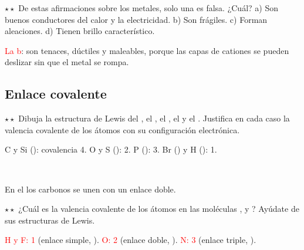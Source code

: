 \begin{exercise}
    \(\star\star\) De estas afirmaciones sobre los metales, solo una es falsa. ¿Cuál? a) Son buenos conductores del calor y la
    electricidad. b) Son frágiles. c) Forman aleaciones. d) Tienen brillo característico.
    \begin{solu}
        \textcolor{red}{La b}: son tenaces, dúctiles y maleables, porque las capas de cationes se pueden deslizar sin que el metal
        se rompa.
    \end{solu}
\end{exercise}

\subsection{Enlace covalente}

\begin{exercise}
    \(\star\star\) Dibuja la estructura de Lewis del , el , el , el  y el .
    Justifica en cada caso la valencia covalente de los átomos con su configuración electrónica.
    \begin{solu}
        C y Si (): covalencia 4. O y S (): 2. P (): 3. Br
        () y H (): 1.
        \begin{center}
            \textcolor{red}{} \quad
            \textcolor{red}{} \quad
            \textcolor{red}{} \\[6pt]
            \textcolor{red}{} \quad
            \textcolor{red}{}
        \end{center}
        En el  los carbonos se unen con un enlace doble.
    \end{solu}
\end{exercise}

\begin{exercise}
    \(\star\star\) ¿Cuál es la valencia covalente de los átomos en las moléculas ,  y ? Ayúdate de sus
    estructuras de Lewis.
    \begin{solu}
        \textcolor{red}{H y F: 1} (enlace simple, ). \textcolor{red}{O: 2} (enlace doble,
        ). \textcolor{red}{N: 3} (enlace triple,
        ).
    \end{solu}
\end{exercise}

